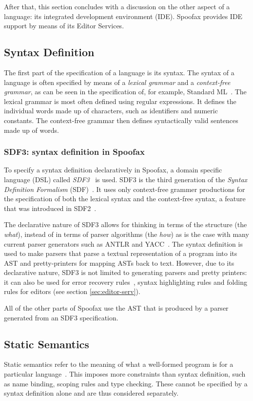 After that, this section concludes with a discussion on the other
aspect of a language: its integrated development environment
(IDE). Spoofax provides IDE support by means of its Editor Services.
\subsection{Syntax Definition}
\label{sec:syntax-def}
The first part of the specification of a language is its syntax. The
syntax of a language is often specified by means of a \emph{lexical
grammar} and a \emph{context-free grammar}, as can be seen in the
specification of, for example, Standard ML~\cite{Milner97}. The
lexical grammar is most often defined using regular expressions. It
defines the individual words made up of characters, such as
identifiers and numeric constants. The context-free grammar then
defines syntactically valid sentences made up of words.

\subsubsection{SDF3: syntax definition in Spoofax}
\label{sec:orgheadline1}
To specify a syntax definition declaratively in Spoofax, a domain
specific language (DSL) called \emph{SDF3}~\cite{Vollebregt12} is used.
SDF3 is the third generation of the \emph{Syntax Definition Formalism}
(SDF)~\cite{Heering89}. It uses only context-free grammer
productions for the specification of both the lexical syntax and the
context-free syntax, a feature that was introduced in
SDF2~\cite{Visser97}.

The declarative nature of SDF3 allows for thinking in terms of the
structure (the \emph{what}), instead of in terms of parser algorithms (the
\emph{how}) as is the case with many current parser generators such as
ANTLR and YACC~\cite{Kats10b}. The syntax definition is used to
make parsers that parse a textual representation of a program into its
AST and pretty-printers for mapping ASTs back to text. However, due to
its declarative nature, SDF3 is not limited to generating parsers and
pretty printers: it can also be used for error recovery
rules~\cite{deJonge12}, syntax highlighting rules and folding
rules for editors (see section \ref{sec:editor-serv}).

All of the other parts of Spoofax use the AST that is produced by a
parser generated from an SDF3 specification.
\subsection{Static Semantics}
\label{sec:static-analysis}
Static semantics refer to the meaning of what a well-formed program is
for a particular language~\cite{Milner97}. This imposes more
constraints than syntax definition, such as name binding, scoping
rules and type checking. These cannot be specified by a syntax
definition alone and are thus considered separately.
